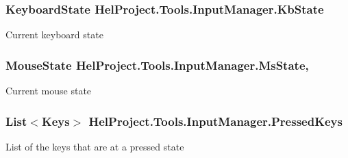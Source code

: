 \subsubsection[{Kb\+State}]{\setlength{\rightskip}{0pt plus 5cm}Keyboard\+State Hel\+Project.\+Tools.\+Input\+Manager.\+Kb\+State\hspace{0.3cm}{\ttfamily [get]}}\label{class_hel_project_1_1_tools_1_1_input_manager_a69b805217e66f7c3b62e7df7b421635b}


Current keyboard state 

\hypertarget{class_hel_project_1_1_tools_1_1_input_manager_adb30a86d3417c694fa8b51e0a46b44cc}{}
\subsubsection[{Ms\+State}]{\setlength{\rightskip}{0pt plus 5cm}Mouse\+State Hel\+Project.\+Tools.\+Input\+Manager.\+Ms\+State\hspace{0.3cm}{\ttfamily [get]}, {\ttfamily [set]}}\label{class_hel_project_1_1_tools_1_1_input_manager_adb30a86d3417c694fa8b51e0a46b44cc}


Current mouse state 

\hypertarget{class_hel_project_1_1_tools_1_1_input_manager_a601df2e87297d6480c60e3fb825848b0}{}
\subsubsection[{Pressed\+Keys}]{\setlength{\rightskip}{0pt plus 5cm}List$<$Keys$>$ Hel\+Project.\+Tools.\+Input\+Manager.\+Pressed\+Keys\hspace{0.3cm}{\ttfamily [get]}}\label{class_hel_project_1_1_tools_1_1_input_manager_a601df2e87297d6480c60e3fb825848b0}


List of the keys that are at a pressed state 

\hypertarget{class_hel_project_1_1_tools_1_1_input_manager_a5add5e83ca9d72a3f1bc89e76572fd66}{}
